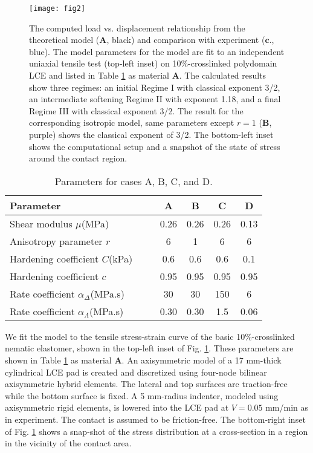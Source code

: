 \documentclass[12pt]{article}
\begin{document}
\begin{figure}
\centering
\texttt{[image: fig2]}
\caption{The computed load vs. displacement relationship from the theoretical model ($\textbf{A}$, black) and comparison with experiment ($\textbf{c.}$, blue).  The model parameters for the model are fit to an independent uniaxial tensile test (top-left inset) on 10\%-crosslinked polydomain LCE and listed in Table \ref{tab:param} as material $\textbf{A}$.  The calculated results show three regimes: an initial Regime I with classical exponent 3/2, an intermediate softening Regime II with exponent 1.18, and a final Regime III with classical exponent 3/2.  The result for the corresponding isotropic model, same parameters except $r=1$ ($\textbf{B}$, purple) shows the classical exponent of 3/2. The bottom-left inset shows the computational setup and a snapshot of the state of stress around the contact region. 
\label{fig:theory}}
\end{figure}


\begin{table}
\centering
\caption{Parameters for cases A, B, C, and D. \label{tab:param}}
\begin{tabular}{l cccc} 
\hline %
Parameter & \textbf{A} & \textbf{B} & \textbf{C} & \textbf{D}\\
\hline %
Shear modulus $\mu$(MPa)  & 0.26 & 0.26 & 0.26 & 0.13\\
Anisotropy parameter $r$ & 6 & 1 & 6 & 6\\
Hardening coefficient $C$(kPa) \ \ \  & 0.6 & 0.6 & 0.6  & 0.1\\
Hardening coefficient $c$ & 0.95& 0.95  & 0.95 & 0.95 \\
Rate coefficient $\alpha_\Delta$(MPa.s) & 30 & 30 & 150 & 6\\
Rate coefficient $\alpha_\Lambda$(MPa.s) & 0.30 & 0.30 & 1.5 & 0.06\\ 
\hline %
\end{tabular}
\end{table}


We fit the model to the tensile stress-strain curve of the basic 10\%-crosslinked nematic elastomer, shown in the top-left inset of Fig. \ref{fig:theory}. These parameters are shown in Table \ref{tab:param} as material $\textbf{A}$. An axisymmetric model of a 17 mm-thick cylindrical LCE pad is created and discretized using four-node bilinear axisymmetric hybrid elements.  The lateral and top surfaces are traction-free while the bottom surface is fixed.   A 5 mm-radius indenter, modeled using axisymmetric rigid elements, is lowered into the LCE pad at $V=0.05$ mm/min as in experiment.  The contact is assumed to be friction-free.   The bottom-right inset of Fig. \ref{fig:theory} shows a snap-shot of the stress distribution at a cross-section in a region in the vicinity of the contact area.
\end{document}
